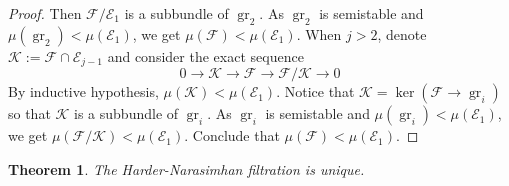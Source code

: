 \documentclass{ctexart}
\newtheorem{theorem}{Theorem}[section]
\newcommand{\grade}{\operatorname{gr}}
\begin{document}
\begin{proof}
    Then $\mathcal{F}/\mathcal{E}_{1}$ is a subbundle of $\grade_{2}$.
    As $\grade_{2}$ is semistable and $\mu(\grade_{2}) < \mu(\mathcal{E}_{1})$, we get $\mu(\mathcal{F}) < \mu(\mathcal{E}_{1})$.
    When $j > 2$, denote $\mathcal{K} := \mathcal{F} \cap \mathcal{E}_{j - 1}$ and consider the exact sequence
    \begin{equation}
        0 \longrightarrow \mathcal{K} \longrightarrow \mathcal{F} \longrightarrow \mathcal{F}/\mathcal{K} \longrightarrow 0
    \end{equation}
    By inductive hypothesis, $\mu(\mathcal{K}) < \mu(\mathcal{E}_{1})$.
    Notice that $\mathcal{K} = \ker (\mathcal{F} \rightarrow \grade_{i})$ so that $\mathcal{K}$ is a subbundle of $\grade_{i}$.
    As $\grade_{i}$ is semistable and $\mu(\grade_{i}) < \mu(\mathcal{E}_{1})$, we get $\mu(\mathcal{F}/\mathcal{K}) < \mu(\mathcal{E}_{1})$.
    Conclude that $\mu(\mathcal{F}) < \mu(\mathcal{E}_{1})$.
\end{proof}
\begin{theorem}
    The Harder-Narasimhan filtration is unique.
    \label{Theorem 7.5}
\end{theorem}
\end{document}
